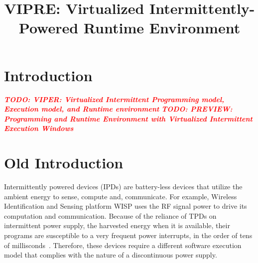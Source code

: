 \documentclass[sigconf,anonymous,review]{acmart}
\newcommand{\TODO}[1]{{\bf \em \textcolor{red}{TODO: #1}\xspace}}
\begin{document}
\title{VIPRE: Virtualized Intermittently-Powered Runtime Environment}

\begin{abstract}

\end{abstract}

\maketitle

\section{Introduction}
\label{sec:intro}
\TODO{VIPER: Virtualized Intermittent Programming model, Execution model, and Runtime environment}
\TODO{PREVIEW: Programming and Runtime Environment with Virtualized Intermittent Execution Windows}





\section{Old Introduction}
	Intermittently powered devices (IPDs) are battery-less devices that utilize the ambient energy to sense, compute and, communicate. For example, Wireless Identification and Sensing platform WISP \cite{wisp} uses the RF signal power to drive its computation and communication. Because of the reliance of TPDs on intermittent power supply, the harvested energy when it is available, their programs are susceptible to a very frequent power interrupts, in the order of tens of millisconds~\cite{}. Therefore, these devices require a different software execution model that complies with the nature of a discontinuous power supply. 
\end{document}
